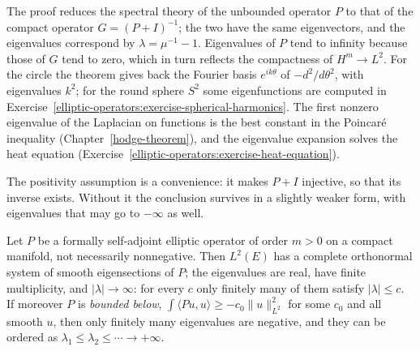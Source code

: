 The proof reduces the spectral theory of the unbounded operator $P$ to that of the compact operator $G = (P + I)^{-1}$; the two have the same eigenvectors, and the eigenvalues correspond by
$\lambda = \mu^{-1} - 1$. Eigenvalues of $P$ tend to infinity because those of $G$ tend to zero, which in turn reflects the compactness of $H^m \to L^2$. For the circle the theorem gives back the
Fourier basis $e^{ik\theta}$ of $-d^2/d\theta^2$, with eigenvalues $k^2$; for the round sphere $S^2$ some eigenfunctions are computed in Exercise~\ref{elliptic-operators:exercise-spherical-harmonics}. The
first nonzero eigenvalue of the Laplacian on functions is the best constant in the Poincar\'e inequality (Chapter~\ref{hodge-theorem}), and the eigenvalue expansion solves the heat equation
(Exercise~\ref{elliptic-operators:exercise-heat-equation}).

The positivity assumption is a convenience: it makes $P + I$ injective, so that its inverse exists. Without it the conclusion survives in a slightly weaker form, with eigenvalues that may go to $-\infty$ as well.

\begin{corollary}\label{elliptic-operators:corollary-spectral-general}
Let $P$ be a formally self-adjoint elliptic operator of order $m > 0$ on a compact manifold, not necessarily nonnegative. Then $L^2(E)$ has a complete orthonormal system of smooth eigensections of $P$; the
eigenvalues are real, have finite multiplicity, and $|\lambda| \to \infty$: for every $c$ only finitely many of them satisfy $|\lambda| \leq c$. If moreover $P$ is \emph{bounded below},
$\int\langle Pu, u\rangle \geq -c_0\|u\|_{L^2}^2$ for some $c_0$ and all smooth $u$, then only finitely many eigenvalues are negative, and they can be ordered as $\lambda_1 \leq \lambda_2 \leq \cdots \to +\infty$.
\end{corollary}

